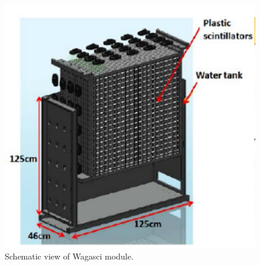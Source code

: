 \begin{figure}[tbh]
\begin{center}
\includegraphics[width=0.6\linewidth]{fig/wagasci_mod.pdf}
\end{center}
\caption{
Schematic view of Wagasci module.
}
\label{fig:wagasci_mod}
\end{figure}
